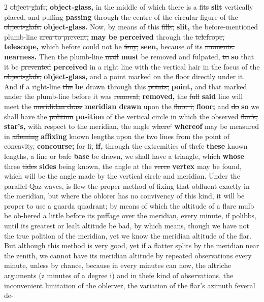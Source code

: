 \documentclass[10pt]{article}
\begin{document}
\begin{multicols}{2}
\sout{object-glafs,} \textbf{object-glass,} in the middle of which there is a \sout{fits} \textbf{slit} vertically placed, and \sout{puffing} \textbf{passing} through the centre of the circular figure of the \sout{object-glafs.} \textbf{object-glass.} Now, by means of this \sout{fills,} \textbf{slit,} the before-mentioned plumb-line \sout{area to prevent,} \textbf{may be perceived} through the \sout{telefcope,} \textbf{telescope,} which before could not be \sout{feny,} \textbf{seen,} because of its \sout{moments.} \textbf{nearness.} Then the plumb-line \sout{mail} \textbf{must} be removed and fulpated, \sout{to} \textbf{so} that it be \sout{prevented} \textbf{perceived} in a right line with the vertical hair in the focus of the \sout{object-glafs,} \textbf{object-glass,} and a point marked on the floor directly under it. And if a right-line \sout{the} \textbf{be} drawn through this \sout{points,} \textbf{point,} and that marked under the plumb-line before it was \sout{removal,} \textbf{removed,} the \sout{full} \textbf{said} line will meet the \sout{merididan draw} \textbf{meridian drawn} upon the \sout{floor i,} \textbf{floor;} and \sout{do} \textbf{so} we shall have the \sout{polition} \textbf{position} of the vertical circle in which the observed \sout{flar's,} \textbf{star's,} with respect to the meridian, the angle \sout{where'} \textbf{whereof} may be measured in \sout{afleming} \textbf{affixing} known lengths upon the two lines from the point of \sout{concavity,} \textbf{concourse;} for \sout{fi,} \textbf{if,} through the extremities of \sout{thefe} \textbf{these} known lengths, a line or \sout{bafe} \textbf{base} be drawn, we shall have a triangle, \sout{which} \textbf{whose} three \sout{tides} \textbf{sides} being known, the angle at the \sout{verce} \textbf{vertex} may be found, which will be the angle made by the vertical circle and meridian. Under the parallel Qaz waves, is flew the proper method of fixing that obfluent exactly in the meridian, but where the oblorer has no convivency of this kind, it will be proper to use a guarda quadrant; by means of which the altitude of a flare mulb be ob-hered a little before its puffage over the meridian, every minute, if polibbs, until its greatest or lealt altitude be bad, by which means, though we have not the true polition of the meridian, yet we know the meridian altitude of the flar. But although this method is very good, yet if a flatter splits by the meridian near the zenith, we cannot have its meridian altitude by repeated observations every minute, unless by chance, because in every minutes can now, the altriche arguments (z minutes of a degree i) and in thefe kind of observations, the inconvenient limitation of the oblerver, the variation of the flar's azimuth feveral de-
\end{multicols}
\end{document}
